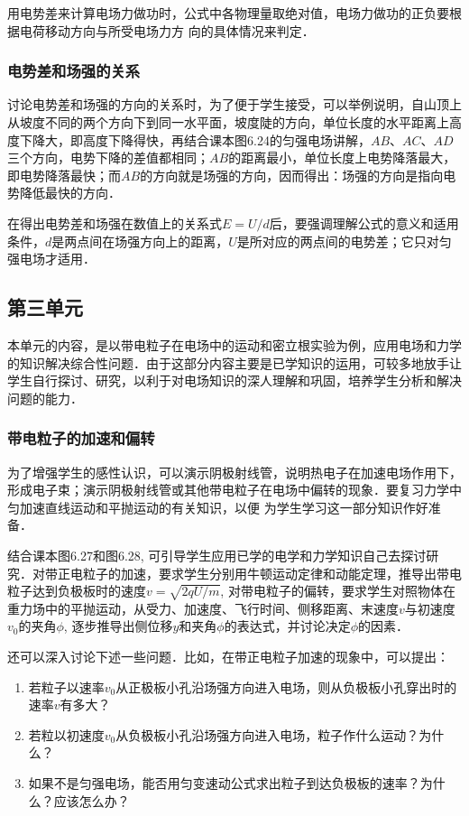 用电势差来计算电场力做功时，公式中各物理量取绝对值，电场力做功的正负要根据电荷移动方向与所受电场力方
向的具体情况来判定．

\subsubsection{电势差和场强的关系}

讨论电势差和场强的方向的关系时，为了便于学生接受，可以举例说明，自山顶上从坡度不同的两个方向下到同一水平面，坡度陡的方向，单位长度的水平距离上高度下降大，即高度下降得快，再结合课本图6.24的匀强电场讲解，$AB$、$AC$、$AD$三个方向，电势下降的差值都相同；$AB$的距离最小，单位长度上电势降落最大，即电势降落最快；而$AB$的方向就是场强的方向，因而得出：场强的方向是指向电势降低最快的方向．

在得出电势差和场强在数值上的关系式$E=U/d$后，要强调理解公式的意义和适用条件，$d$是两点间在场强方向上的距离，$U$是所对应的两点间的电势差；它只对匀强电场才适用．

\subsection{第三单元}
本单元的内容，是以带电粒子在电场中的运动和密立根实验为例，应用电场和力学的知识解决综合性问题．由于这部分内容主要是已学知识的运用，可较多地放手让学生自行探讨、研究，以利于对电场知识的深人理解和巩固，培养学生分析和解决问题的能力．

\subsubsection{带电粒子的加速和偏转}

为了增强学生的感性认识，可以演示阴极射线管，说明热电子在加速电场作用下，形成电子束；演示阴极射线管或其他带电粒子在电场中偏转的现象．要复习力学中匀加速直线运动和平抛运动的有关知识，以便
为学生学习这一部分知识作好准备．

结合课本图6.27和图6.28, 可引导学生应用已学的电学和力学知识自己去探讨研究．对带正电粒子的加速，要求学生分别用牛顿运动定律和动能定理，推导出带电粒子达到负极板时的速度$v=\sqrt{2qU/m}$, 对带电粒子的偏转，要求学生对照物体在重力场中的平抛运动，从受力、加速度、飞行时间、侧移距离、末速度$v$与初速度$v_0$的夹角$\phi$, 逐步推导出侧位移$y$和夹角$\phi$的表达式，并讨论决定$\phi$的因素．

还可以深入讨论下述一些问题．比如，在带正电粒子加速的现象中，可以提出：
\begin{enumerate}
\item 若粒子以速率$v_0$从正极板小孔沿场强方向进入电场，则从负极板小孔穿出时的速率$v$有多大？
\item 若粒以初速度$v_0$从负极板小孔沿场强方向进入电场，粒子作什么运动？为什么？
\item 如果不是匀强电场，能否用匀变速动公式求出粒子到达负极板的速率？为什么？应该怎么办？
\end{enumerate}


